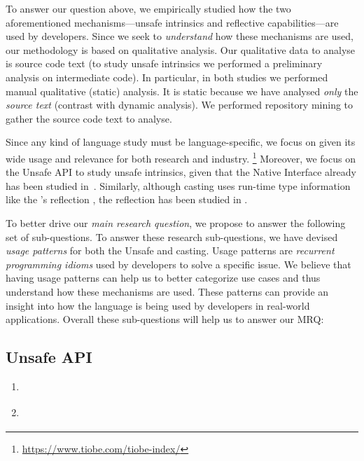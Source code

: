 To answer our question above,
we empirically studied how the two aforementioned mechanisms---unsafe intrinsics and reflective capabilities---are used by developers.
Since we seek to \emph{understand} how these mechanisms are used,
our methodology is based on qualitative analysis.
Our qualitative data to analyse is source code text
(to study unsafe intrinsics we performed a preliminary analysis on intermediate code).
In particular, in both studies we performed manual qualitative (static) analysis.
It is static because we have analysed \emph{only} the \emph{source text}
(contrast with dynamic analysis).
We performed repository mining to gather the source code text to analyse.

Since any kind of language study must be language-specific,
we focus on \java{} given its wide usage and relevance for both
research and industry.%
\footnote{\url{https://www.tiobe.com/tiobe-index/}}
Moreover, we focus on the \java{} Unsafe API to study unsafe intrinsics,
given that the \java{} Native Interface already has been studied
in~\cite{tanSafeJavaNative2006,tanEmpiricalSecurityStudy2008,kondohFindingBugsJava2008,sunNativeGuardProtectingAndroid2014,liFindingBugsExceptional2009}.
Similarly, although casting uses run-time type information like
the \java{}'s reflection \api{},
the reflection \api{} has been studied in
\cite{livshitsImprovingSoftwareSecurity2006,livshitsReflectionAnalysisJava2005,landmanChallengesStaticAnalysis2017}.

To better drive our \emph{main research question},
we propose to answer the following set of sub-questions.
To answer these research sub-questions,
we have devised \emph{usage patterns} for both the Unsafe \api{} and casting.
Usage patterns are \emph{recurrent programming idioms} used by developers to solve a specific issue.
We believe that having usage patterns can help us to better categorize use cases and
thus understand how these mechanisms are used.
These patterns can provide an insight into how the language is being used by developers in real-world applications.
Overall these sub-questions will help us to answer our MRQ:

\subsection*{Unsafe API}

\begin{enumerate}[label=$RQ/U\arabic*:$,leftmargin=3.4\parindent]
\item {\bf \urqA} \urqAdesc{}
\item {\bf \urqB} \urqBdesc{}
\end{enumerate}

